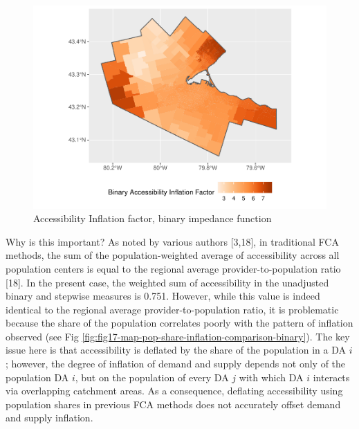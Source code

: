 \documentclass[10pt,letterpaper]{article}
\begin{document}
\begin{figure}
\includegraphics[width=0.95\linewidth]{Supply_and_Demand_Inflation_in_FCA_Methods_v2.1_files/figure-latex/fig16-map-accessibility-binary-comparison-1} \caption{\label{fig:fig16-map-accessibility-binary-comparison}Accessibility Inflation factor, binary impedance function}\label{fig:fig16-map-accessibility-binary-comparison}
\end{figure}

Why is this important? As noted by various authors {[}3,18{]}, in
traditional FCA methods, the sum of the population-weighted average of
accessibility across all population centers is equal to the regional
average provider-to-population ratio {[}18{]}. In the present case, the
weighted sum of accessibility in the unadjusted binary and stepwise
measures is 0.751. However, while this value is indeed identical to the
regional average provider-to-population ratio, it is problematic because
the share of the population correlates poorly with the pattern of
inflation observed (see Fig
\ref{fig:fig17-map-pop-share-inflation-comparison-binary}). The key
issue here is that accessibility is deflated by the share of the
population in a DA \(i\); however, the degree of inflation of demand and
supply depends not only of the population DA \(i\), but on the
population of every DA \(j\) with which DA \(i\) interacts via
overlapping catchment areas. As a consequence, deflating accessibility
using population shares in previous FCA methods does not accurately
offset demand and supply inflation.
\end{document}

